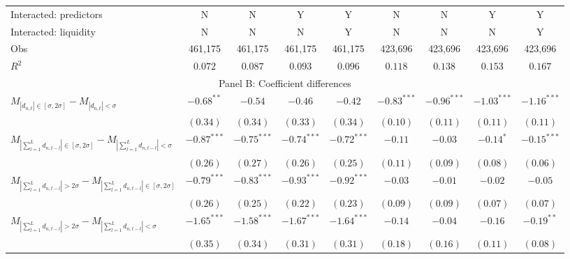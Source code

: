 \begin{tabular}{lcccccccc}
  Interacted: predictors & N & N & Y & Y & N & N & Y & Y \\ 
   \vspace{5pt}Interacted: liquidity & N & N & N & Y & N & N & N & Y \\ 
  Obs & 461,175 & 461,175 & 461,175 & 461,175 & 423,696 & 423,696 & 423,696 & 423,696 \\ 
  $R^2$ & $0.072$ & $0.087$ & $0.093$ & $0.096$ & $0.118$ & $0.138$ & $0.153$ & $0.167$ \\ 
   \hline \multicolumn{9}{c}{Panel B: Coefficient differences} \\
 \hline$M_{\left|d_{n,t}\right| \in [\sigma, 2\sigma]}-M_{\left|d_{n,t}\right| < \sigma}$ & $-0.68^{**}$ & $-0.54$ & $-0.46$ & $-0.42$ & $-0.83^{***}$ & $-0.96^{***}$ & $-1.03^{***}$ & $-1.16^{***}$ \\ 
   \vspace{5pt} & $(0.34)$ & $(0.34)$ & $(0.33)$ & $(0.34)$ & $(0.10)$ & $(0.11)$ & $(0.11)$ & $(0.11)$ \\ 
  $M_{\left|\sum_{l=1}^L d_{n,t-l}\right| \in [\sigma, 2\sigma]}-M_{\left|\sum_{l=1}^L d_{n,t-l}\right| < \sigma}$ & $-0.87^{***}$ & $-0.75^{***}$ & $-0.74^{***}$ & $-0.72^{***}$ & $-0.11$ & $-0.03$ & $-0.14^{*}$ & $-0.15^{***}$ \\ 
   & $(0.26)$ & $(0.27)$ & $(0.26)$ & $(0.25)$ & $(0.11)$ & $(0.09)$ & $(0.08)$ & $(0.06)$ \\ 
  $M_{\left|\sum_{l=1}^L d_{n,t-l}\right| > 2 \sigma}-M_{\left|\sum_{l=1}^L d_{n,t-l}\right| \in [\sigma, 2\sigma]}$ & $-0.79^{***}$ & $-0.83^{***}$ & $-0.93^{***}$ & $-0.92^{***}$ & $-0.03$ & $-0.01$ & $-0.02$ & $-0.05$ \\ 
   & $(0.26)$ & $(0.25)$ & $(0.22)$ & $(0.23)$ & $(0.09)$ & $(0.09)$ & $(0.07)$ & $(0.07)$ \\ 
  $M_{\left|\sum_{l=1}^L d_{n,t-l}\right| > 2 \sigma}-M_{\left|\sum_{l=1}^L d_{n,t-l}\right| < \sigma}$ & $-1.65^{***}$ & $-1.58^{***}$ & $-1.67^{***}$ & $-1.64^{***}$ & $-0.14$ & $-0.04$ & $-0.16$ & $-0.19^{**}$ \\ 
   & $(0.35)$ & $(0.34)$ & $(0.31)$ & $(0.31)$ & $(0.18)$ & $(0.16)$ & $(0.11)$ & $(0.08)$ \\ 
   \hline 
\end{tabular}
